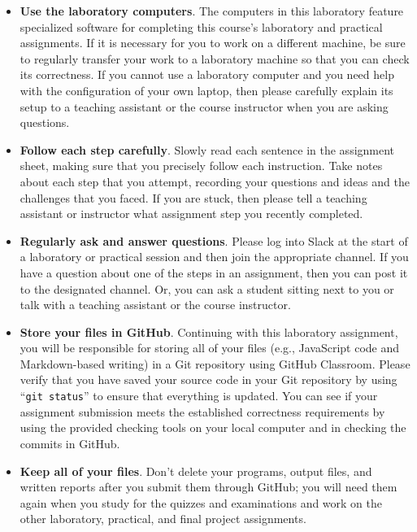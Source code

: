 \documentclass[11pt]{article}
\newcommand{\command}[1]{``\lstinline{#1}''}
\begin{document}
\begin{itemize}
  \setlength{\itemsep}{0pt}

\item {\bf Use the laboratory computers}. The computers in this laboratory feature specialized software for completing
  this course's laboratory and practical assignments. If it is necessary for you to work on a different machine, be sure
  to regularly transfer your work to a laboratory machine so that you can check its correctness. If you cannot use a
  laboratory computer and you need help with the configuration of your own laptop, then please carefully explain its
  setup to a teaching assistant or the course instructor when you are asking questions.

\item {\bf Follow each step carefully}. Slowly read each sentence in the assignment sheet, making sure that you
  precisely follow each instruction. Take notes about each step that you attempt, recording your questions and ideas and
  the challenges that you faced. If you are stuck, then please tell a teaching assistant or instructor what assignment
  step you recently completed.

\item {\bf Regularly ask and answer questions}. Please log into Slack at the start of a laboratory or practical session
  and then join the appropriate channel. If you have a question about one of the steps in an assignment, then you can
  post it to the designated channel. Or, you can ask a student sitting next to you or talk with a teaching assistant or
  the course instructor.

\item {\bf Store your files in GitHub}. Continuing with this laboratory assignment, you will be responsible for storing
  all of your files (e.g., JavaScript code and Markdown-based writing) in a Git repository using GitHub Classroom.
  Please verify that you have saved your source code in your Git repository by using \command{git status} to ensure that
  everything is updated. You can see if your assignment submission meets the established correctness requirements by
  using the provided checking tools on your local computer and in checking the commits in GitHub.

\item {\bf Keep all of your files}. Don't delete your programs, output files, and written reports after you submit them
  through GitHub; you will need them again when you study for the quizzes and examinations and work on the other
  laboratory, practical, and final project assignments.


\end{itemize}
\end{document}
